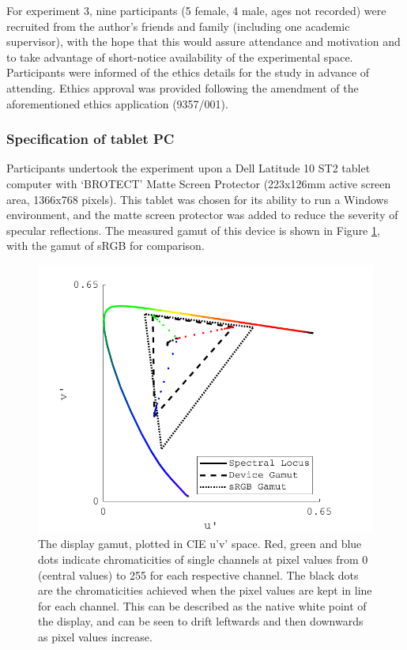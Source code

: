 For experiment 3, nine participants (5 female, 4 male, ages not recorded) were recruited from the author's friends and family (including one academic supervisor), with the hope that this would assure attendance and motivation and to take advantage of short-notice availability of the experimental space. Participants were informed of the ethics details for the study in advance of attending. Ethics approval was provided following the amendment of the aforementioned ethics application (9357/001).


\subsubsection{Specification of tablet PC}

Participants undertook the experiment upon a Dell Latitude 10 ST2 tablet computer with `BROTECT' Matte Screen Protector (223x126mm active screen area, 1366x768 pixels). This tablet was chosen for its ability to run a Windows environment, and the matte screen protector was added to reduce the severity of specular reflections. The measured gamut of this device is shown in Figure \ref{fig:gamut}, with the gamut of sRGB for comparison.

\begin{figure}[hbtp]
\includegraphics[max width=\textwidth]{figs/tablet/gamut.pdf}
\caption{The display gamut, plotted in CIE u'v' space. Red, green and blue dots indicate chromaticities of single channels at pixel values from 0 (central values) to 255 for each respective channel. The black dots are the chromaticities achieved when the pixel values are kept in line for each channel. This can be described as the native white point of the display, and can be seen to drift leftwards and then downwards as pixel values increase.}
\label{fig:gamut}
\end{figure}

